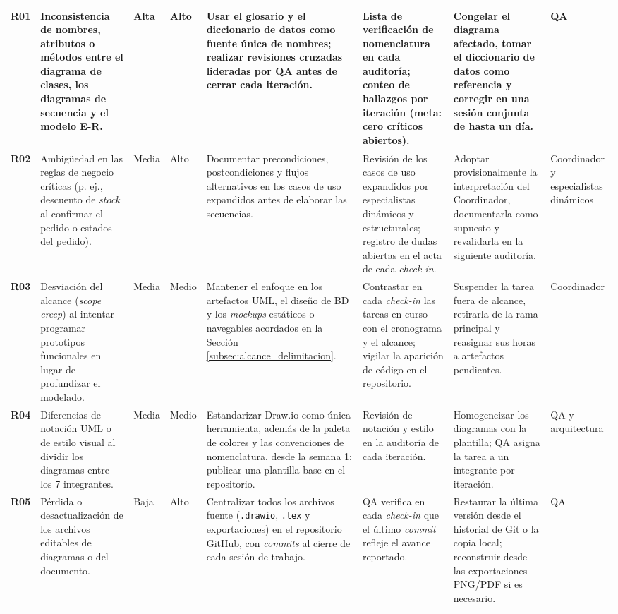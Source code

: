 {\begin{xltabular}{\textwidth}{|>{\raggedright\arraybackslash}p{0.7cm}|>{\raggedright\arraybackslash}p{2.3cm}|>{\centering\arraybackslash}p{0.9cm}|>{\centering\arraybackslash}p{1.0cm}|X|X|X|>{\raggedright\arraybackslash}p{1.6cm}|}
    \textbf{R01} & Inconsistencia de nombres, atributos o métodos entre el diagrama de clases, los diagramas de secuencia y el modelo E-R. & Alta & Alto & Usar el glosario y el diccionario de datos como fuente única de nombres; realizar revisiones cruzadas lideradas por QA antes de cerrar cada iteración. & Lista de verificación de nomenclatura en cada auditoría; conteo de hallazgos por iteración (meta: cero críticos abiertos). & Congelar el diagrama afectado, tomar el diccionario de datos como referencia y corregir en una sesión conjunta de hasta un día. & QA \\*
    \hline
    \textbf{R02} & Ambigüedad en las reglas de negocio críticas (p. ej., descuento de \textit{stock} al confirmar el pedido o estados del pedido). & Media & Alto & Documentar precondiciones, postcondiciones y flujos alternativos en los casos de uso expandidos antes de elaborar las secuencias. & Revisión de los casos de uso expandidos por especialistas dinámicos y estructurales; registro de dudas abiertas en el acta de cada \textit{check-in}. & Adoptar provisionalmente la interpretación del Coordinador, documentarla como supuesto y revalidarla en la siguiente auditoría. & Coordinador y especialistas dinámicos \\*
    \hline
    \textbf{R03} & Desviación del alcance (\textit{scope creep}) al intentar programar prototipos funcionales en lugar de profundizar el modelado. & Media & Medio & Mantener el enfoque en los artefactos UML, el diseño de BD y los \textit{mockups} estáticos o navegables acordados en la Sección \ref{subsec:alcance_delimitacion}. & Contrastar en cada \textit{check-in} las tareas en curso con el cronograma y el alcance; vigilar la aparición de código en el repositorio. & Suspender la tarea fuera de alcance, retirarla de la rama principal y reasignar sus horas a artefactos pendientes. & Coordinador \\*
    \hline
    \textbf{R04} & Diferencias de notación UML o de estilo visual al dividir los diagramas entre los 7 integrantes. & Media & Medio & Estandarizar Draw.io como única herramienta, además de la paleta de colores y las convenciones de nomenclatura, desde la semana 1; publicar una plantilla base en el repositorio. & Revisión de notación y estilo en la auditoría de cada iteración. & Homogeneizar los diagramas con la plantilla; QA asigna la tarea a un integrante por iteración. & QA y arquitectura \\*
    \hline
    \textbf{R05} & Pérdida o desactualización de los archivos editables de diagramas o del documento. & Baja & Alto & Centralizar todos los archivos fuente (\texttt{.drawio}, \texttt{.tex} y exportaciones) en el repositorio GitHub, con \textit{commits} al cierre de cada sesión de trabajo. & QA verifica en cada \textit{check-in} que el último \textit{commit} refleje el avance reportado. & Restaurar la última versión desde el historial de Git o la copia local; reconstruir desde las exportaciones PNG/PDF si es necesario. & QA \\*

\end{xltabular}}

